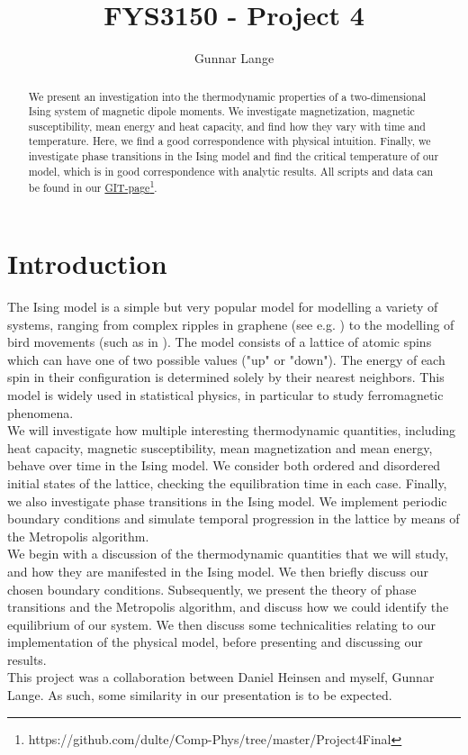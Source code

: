 \documentclass[a4paper, 10pt]{article}
\title{FYS3150 - Project 4}
\author{Gunnar Lange}
\begin{document}
\maketitle
\begin{abstract}
We present an investigation into the thermodynamic properties of a two-dimensional Ising system of magnetic dipole moments. We investigate magnetization, magnetic susceptibility, mean energy and heat capacity, and find how they vary with time and temperature. Here, we find a good correspondence with physical intuition. Finally, we investigate phase transitions in the Ising model and find the critical temperature of our model, which is in good correspondence with analytic results. All scripts and data can be found in our \href{https://github.com/dulte/Comp-Phys/tree/master/Project4Final}{GIT-page}\footnote{https://github.com/dulte/Comp-Phys/tree/master/Project4Final}.
\end{abstract}
\tableofcontents
\section{Introduction}
The Ising model is a simple but very popular model for modelling a variety of systems, ranging from complex ripples in graphene (see e.g. \cite{Graphene}) to the modelling of bird movements (such as in \cite{Birds}). The model consists of a lattice of atomic spins which can have one of two possible values ("up" or "down"). The energy of each spin in their configuration is determined solely by their nearest neighbors. This model is widely used in statistical physics, in particular to study ferromagnetic phenomena.\\
\linebreak
We will investigate how multiple interesting thermodynamic quantities, including heat capacity, magnetic susceptibility, mean magnetization and mean energy, behave over time in the Ising model. We consider both ordered and disordered initial states of the lattice, checking the equilibration time in each case. Finally, we also investigate phase transitions in the Ising model. We implement periodic boundary conditions and simulate temporal progression in the lattice by means of the Metropolis algorithm.\\
\linebreak
We begin with a discussion of the thermodynamic quantities that we will study, and how they are manifested in the Ising model. We then briefly discuss our chosen boundary conditions. Subsequently, we present the theory of phase transitions and the Metropolis algorithm, and discuss how we could identify the equilibrium of our system. We then discuss some technicalities relating to our implementation of the physical model, before presenting and discussing our results.\\
\linebreak
This project was a collaboration between Daniel Heinsen and myself, Gunnar Lange. As such, some similarity in our presentation is to be expected. 
\end{document}
